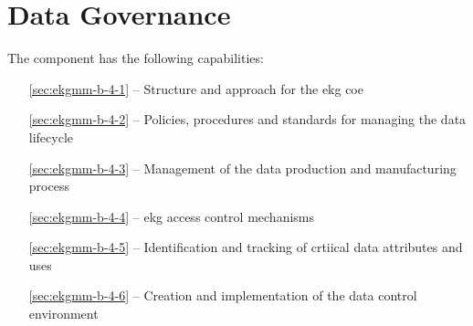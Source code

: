 \chapter{Data Governance}\label{ch:ekgmm-b-4} %

The  component has the following capabilities:

\begin{itemize}[leftmargin=.5in]
  \item [\ref{sec:ekgmm-b-4-1}]  -- Structure and approach for the \gls{ekg} \gls{coe}
  \item [\ref{sec:ekgmm-b-4-2}]  -- Policies, procedures and standards for managing the data lifecycle
  \item [\ref{sec:ekgmm-b-4-3}]  -- Management of the data production and manufacturing process 
  \item [\ref{sec:ekgmm-b-4-4}]  -- \gls{ekg} access control mechanisms
  \item [\ref{sec:ekgmm-b-4-5}]  -- Identification and tracking of crtiical data attributes and uses
  \item [\ref{sec:ekgmm-b-4-6}]  -- Creation and implementation of the data control environment
\end{itemize}







